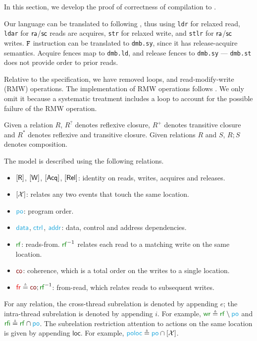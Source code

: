 In this section, we develop the proof of correctness of compilation to \armeight.  

Our language can be translated to \armeight{} following
\citet{DBLP:journals/pacmpl/PodkopaevLV19}, thus using \texttt{ldr} for
relaxed read, \texttt{ldar} for ${\mathsf{ra}}$/${\mathsf{sc}}$ reads are acquires,
\texttt{str} for relaxed write, and \texttt{stlr} for ${\mathsf{ra}}$/${\mathsf{sc}}$
writes.  $\texttt{F}$ instruction can be translated to \texttt{dmb.sy}, since it
has release-acquire semantics.  Acquire fences map to \texttt{dmb.ld}, and
release fences to \texttt{dmb.sy} --- \texttt{dmb.st} does not provide order
to prior reads.

Relative to the \armeight{} specification, we have removed loops, and
read-modify-write (RMW) operations.  The implementation of RMW operations
follows \citet{DBLP:journals/pacmpl/PodkopaevLV19}.  We only omit it because
a systematic treatment includes a loop to account for the possible failure of
the RMW operation.

Given a relation $R$, $R^?$ denotes reflexive closure, $R^+$ denotes
transitive closure and $R^*$ denotes reflexive and transitive closure.  Given
relations $R$ and $S$, $R;S$ denotes composition.


The \armeight{} model is described using the following relations.
\begin{itemize}
\item $[\mathsf{R}]$, $[\mathsf{W}]$, $[\mathsf{Acq}]$, $[\mathsf{Rel}]$: identity on reads, writes, acquires
  and releases.
\item $[\mathcal{X}]$: relates any two events that touch the same location.
\item $\rpox$: program order.
\item $\rdata$, $\rctrl$, $\raddr$: data, control and address dependencies.
\item $\rrfx$: reads-from. $\rrfx^{-1}$ relates each read to a matching write
  on the same location.
\item $\rco$: coherence, which is a total order on the writes to a single
  location.
\item ${\rfr}\eqdef{\rco};\rrfx^{-1}$: from-read, which relates reads to
  subsequent writes.
\end{itemize}
For any relation, the cross-thread subrelation is denoted by appending $e$;
the intra-thread subrelation is denoted by appending $i$.  For example,
${\rrfe}\eqdef{\rrfx}\setminus{\rpox}$ and ${\rrfi}\eqdef{\rrfx}\cap{\rpox}$.
The subrelation restriction attention to actions on the same location is
given by appending $\mathsf{loc}$.  For example, ${\rpoloc}\eqdef{\rpox}\cap{\IDLoc}$.

